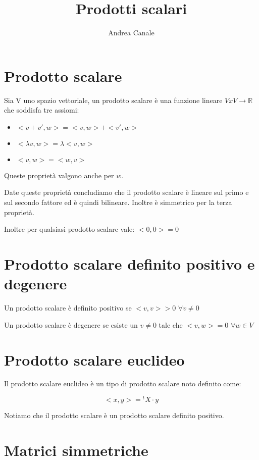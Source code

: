 \documentclass[a4paper, 10pt]{article}
\title{Prodotti scalari}
\author{Andrea Canale}
\begin{document}
\maketitle
\tableofcontents

\section{Prodotto scalare}

Sia V uno spazio vettoriale, un prodotto scalare è una funzione lineare $V x V \rightarrow \mathbb{R}$ che soddisfa tre assiomi:

\begin{itemize}
	\item $<v+v',w> = <v,w> + <v', w>$
	\item $<\lambda v, w> = \lambda <v,w>$
	\item $<v,w> = <w,v>$
\end{itemize}

Queste proprietà valgono anche per $w$.

Date queste proprietà concludiamo che il prodotto scalare è lineare sul primo e sul secondo fattore ed è quindi bilineare. Inoltre è simmetrico per la terza proprietà.

Inoltre per qualsiasi prodotto scalare vale: $<0,0>=0$

\section{Prodotto scalare definito positivo e degenere}

Un prodotto scalare è definito positivo se $<v,v> > 0$ $\forall v \neq 0$

Un prodotto scalare è degenere se esiste un $v \neq 0$ tale che $<v,w> = 0$ $\forall w \in V$

\section{Prodotto scalare euclideo}

Il prodotto scalare euclideo è un tipo di prodotto scalare noto definito come:

$$<x,y> = {^t}X \cdot y$$

Notiamo che il prodotto scalare è un prodotto scalare definito positivo.

\section{Matrici simmetriche}
\end{document}
